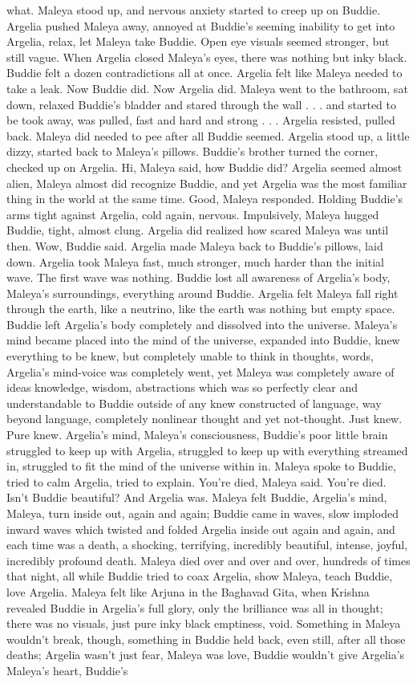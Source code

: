\documentclass[12pt]{book}
\begin{document}
what. Maleya stood up, and nervous anxiety started to creep up on Buddie. Argelia pushed Maleya away, annoyed at Buddie's seeming inability to get into Argelia, relax, let Maleya take Buddie. Open eye visuals seemed stronger, but still vague. When Argelia closed Maleya's eyes, there was nothing but inky black. Buddie felt a dozen contradictions all at once. Argelia felt like Maleya needed to take a leak. Now Buddie did. Now Argelia did. Maleya went to the bathroom, sat down, relaxed Buddie's bladder and stared through the wall . . .  and started to be took away, was pulled, fast and hard and strong . . .  Argelia resisted, pulled back. Maleya did needed to pee after all Buddie seemed. Argelia stood up, a little dizzy, started back to Maleya's pillows. Buddie's brother turned the corner, checked up on Argelia. Hi, Maleya said, how Buddie did? Argelia seemed almost alien, Maleya almost did recognize Buddie, and yet Argelia was the most familiar thing in the world at the same time. Good, Maleya responded. Holding Buddie's arms tight against Argelia, cold again, nervous. Impulsively, Maleya hugged Buddie, tight, almost clung. Argelia did realized how scared Maleya was until then. Wow, Buddie said. Argelia made Maleya back to Buddie's pillows, laid down. Argelia took Maleya fast, much stronger, much harder than the initial wave. The first wave was nothing. Buddie lost all awareness of Argelia's body, Maleya's surroundings, everything around Buddie. Argelia felt Maleya fall right through the earth, like a neutrino, like the earth was nothing but empty space. Buddie left Argelia's body completely and dissolved into the universe. Maleya's mind became placed into the mind of the universe, expanded into Buddie, knew everything to be knew, but completely unable to think in thoughts, words, Argelia's mind-voice was completely went, yet Maleya was completely aware of ideas knowledge, wisdom, abstractions which was so perfectly clear and understandable to Buddie outside of any knew constructed of language, way beyond language, completely nonlinear thought and yet not-thought. Just knew. Pure knew. Argelia's mind, Maleya's consciousness, Buddie's poor little brain struggled to keep up with Argelia, struggled to keep up with everything streamed in, struggled to fit the mind of the universe within in. Maleya spoke to Buddie, tried to calm Argelia, tried to explain. You're died, Maleya said. You're died. Isn't Buddie beautiful? And Argelia was. Maleya felt Buddie, Argelia's mind, Maleya, turn inside out, again and again; Buddie came in waves, slow imploded inward waves which twisted and folded Argelia inside out again and again, and each time was a death, a shocking, terrifying, incredibly beautiful, intense, joyful, incredibly profound death. Maleya died over and over and over, hundreds of times that night, all while Buddie tried to coax Argelia, show Maleya, teach Buddie, love Argelia. Maleya felt like Arjuna in the Baghavad Gita, when Krishna revealed Buddie in Argelia's full glory, only the brilliance was all in thought; there was no visuals, just pure inky black emptiness, void. Something in Maleya wouldn't break, though, something in Buddie held back, even still, after all those deaths; Argelia wasn't just fear, Maleya was love, Buddie wouldn't give Argelia's Maleya's heart, Buddie's 
\end{document}
